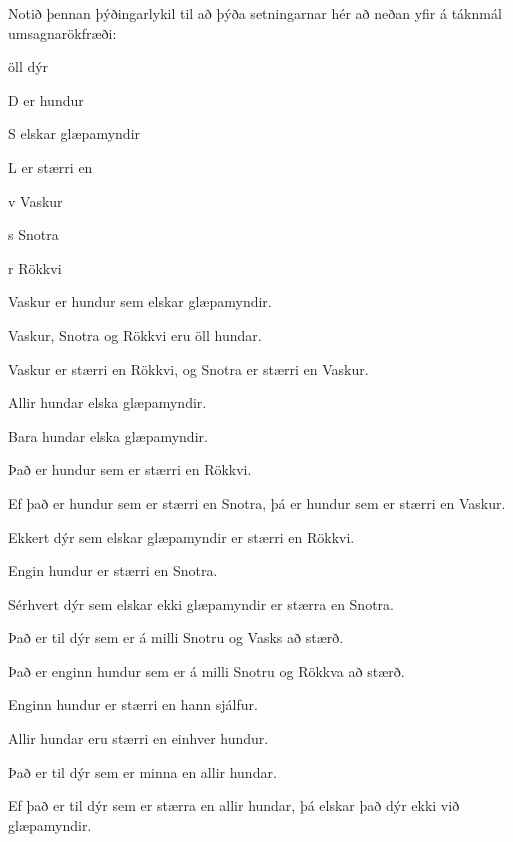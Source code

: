 \problempart 
Notið þennan þýðingarlykil til að þýða setningarnar hér að neðan yfir á táknmál umsagnarökfræði:
\begin{ekey}
\item[\text{yfirgrip}] öll dýr
\item[D]  er hundur
\item[S]  elskar glæpamyndir
\item[L]  er stærri en 
\item[v] Vaskur
\item[s] Snotra
\item[r] Rökkvi
\end{ekey}
\begin{earg}
\item Vaskur er hundur sem elskar glæpamyndir.
\item Vaskur, Snotra og Rökkvi eru öll hundar.
\item Vaskur er stærri en Rökkvi, og Snotra er stærri en Vaskur.
\item Allir hundar elska glæpamyndir.
\item Bara hundar elska glæpamyndir.
\item Það er hundur sem er stærri en Rökkvi.
\item Ef það er hundur sem er stærri en Snotra, þá er hundur sem er stærri en Vaskur.
\item Ekkert dýr sem elskar glæpamyndir er stærri en Rökkvi.
\item Engin hundur er stærri en Snotra.
\item Sérhvert dýr sem elskar ekki glæpamyndir er stærra en Snotra.
\item Það er til dýr sem er á milli Snotru og Vasks að stærð.
\item Það er enginn hundur sem er á milli Snotru  og Rökkva að stærð.
\item Enginn hundur er stærri en hann sjálfur.
\item Allir hundar eru stærri en einhver hundur.
\item Það er til dýr sem er minna en allir hundar.
\item Ef það er til dýr sem er stærra en allir hundar, þá elskar það dýr ekki við glæpamyndir.
\end{earg}

